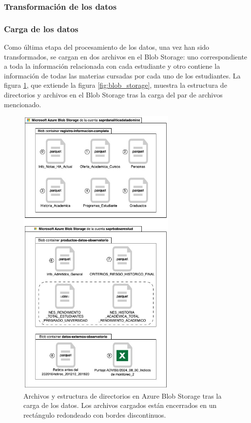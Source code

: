 \subsubsection{Transformación de los datos}


\subsubsection{Carga de los datos}

Como última etapa del procesamiento de los datos, una vez han sido transformados, se cargan en dos archivos en el Blob Storage: uno correspondiente a toda la información relacionada con cada estudiante y otro contiene la información de todas las materias cursadas por cada uno de los estudiantes. La figura \ref{fig:blob_storage_post}, que extiende la figura \ref{fig:blob_storage}, muestra la estructura de directorios y archivos en el Blob Storage tras la carga del par de archivos mencionado.

\begin{figure}[h]
    \centering
    \includegraphics[width=0.7\textwidth]{img/blob_storage_post.jpg}
    \caption{Archivos y estructura de directorios en Azure Blob Storage tras la carga de los datos. Los archivos cargados están encerrados en un rectángulo redondeado con bordes discontinuos.}
    \label{fig:blob_storage_post}
\end{figure}

